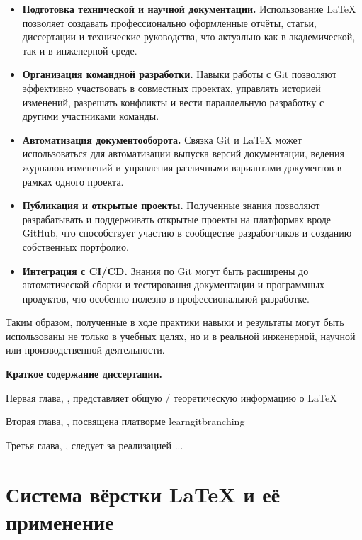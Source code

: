\documentclass[a4paper,12pt]{report}
\begin{document}
\begin{itemize}
    \item \textbf{Подготовка технической и научной документации.} Использование \LaTeX{} позволяет создавать профессионально оформленные отчёты, статьи, диссертации и технические руководства, что актуально как в академической, так и в инженерной среде.
    
    \item \textbf{Организация командной разработки.} Навыки работы с Git позволяют эффективно участвовать в совместных проектах, управлять историей изменений, разрешать конфликты и вести параллельную разработку с другими участниками команды.
    
    \item \textbf{Автоматизация документооборота.} Связка Git и \LaTeX{} может использоваться для автоматизации выпуска версий документации, ведения журналов изменений и управления различными вариантами документов в рамках одного проекта.
    
    \item \textbf{Публикация и открытые проекты.} Полученные знания позволяют разрабатывать и поддерживать открытые проекты на платформах вроде GitHub, что способствует участию в сообществе разработчиков и созданию собственных портфолио.
    
    \item \textbf{Интеграция с CI/CD.} Знания по Git могут быть расширены до автоматической сборки и тестирования документации и программных продуктов, что особенно полезно в профессиональной разработке.
\end{itemize}

Таким образом, полученные в ходе практики навыки и результаты могут быть использованы не только в учебных целях, но и в реальной инженерной, научной или производственной деятельности.

\textbf{Краткое содержание диссертации.}

Первая глава, , представляет общую / теоретическую информацию о \LaTeX{}

Вторая глава, , посвящена платворме learngitbranching

Третья глава, , следует за реализацией ...

\chapter{Система вёрстки \LaTeX{} и её применение}\label{intro_chapter_title}
\end{document}
